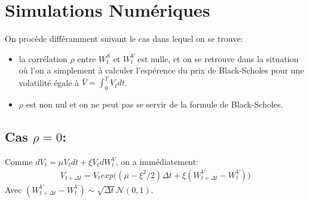 \documentclass{report}
\begin{document}
\section*{Simulations Numériques}
On procède différamment suivant le cas dans lequel on se trouve:
\begin{itemize}
	\item la corrélation $\rho$ entre $W_t^S$ et $W_t^V$ est nulle, et on se retrouve dans la situation où l'on a simplement à calculer l'espérence du prix de Black-Scholes pour une volatilité égale à $\bar{V} = \int_0^T{V_t dt}$.
	\item $\rho$ est non nul et on ne peut pas se servir de la formule de Black-Scholes.
\end{itemize}
\subsection*{Cas $\rho=0$:}
Comme $dV_t = \mu V_t dt + \xi V_t dW^V_t$, on a immédiatement:
\begin{eqnarray*}
V_{t + \Delta t} = V_t exp\big((\mu - \xi^2/2)\Delta t + \xi (W^V_{t+\Delta t} - W^V_t)\big)
\end{eqnarray*}
Avec $(W^V_{t + \Delta t} - W^V_t) \sim \sqrt{\Delta t}\mathcal{N}(0, 1)$.\\
\end{document}
